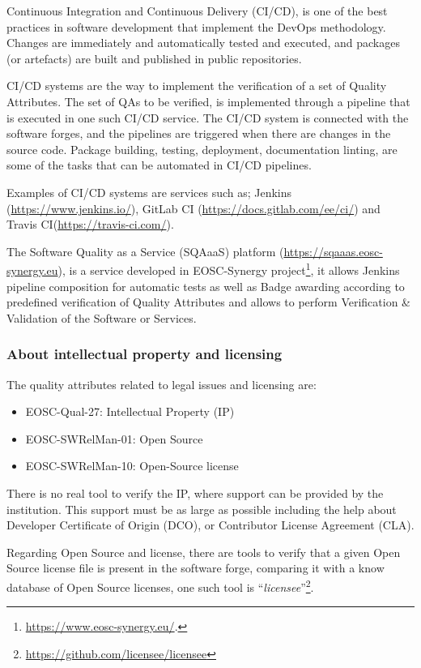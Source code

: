 Continuous Integration and Continuous Delivery (CI/CD), is one of the best practices in software development that implement the DevOps methodology. Changes are immediately and automatically tested and executed, and packages (or artefacts) are built and published in public repositories. 

CI/CD systems are the way to implement the verification of a set of Quality Attributes. The set of QAs to be verified, is implemented through a pipeline that is executed in one such CI/CD service. The CI/CD system is connected with the software forges, and the pipelines are triggered when there are changes in the source code.
Package building, testing, deployment, documentation linting, are some of the tasks that can be automated in CI/CD pipelines.

Examples of CI/CD systems are services such as; Jenkins (\url{https://www.jenkins.io/}), GitLab CI (\url{https://docs.gitlab.com/ee/ci/}) and Travis CI(\url{https://travis-ci.com/}).

The Software Quality as a Service (SQAaaS) platform (\url{https://sqaaas.eosc-synergy.eu}), is a service developed in EOSC-Synergy project\footnote{\url{https://www.eosc-synergy.eu/}.}, it allows Jenkins pipeline composition for automatic tests as well as Badge awarding according to predefined verification of Quality Attributes and allows to perform Verification \& Validation of the Software or Services.

\subsubsection{About intellectual property and licensing}

The quality attributes related to legal issues and licensing are:

\begin{itemize}
  \item EOSC-Qual-27: Intellectual Property (IP)
  \item EOSC-SWRelMan-01: Open Source
  \item EOSC-SWRelMan-10: Open-Source license
\end{itemize}

There is no real tool to verify the IP, where support can be provided by the institution. This support must be as large as possible including the help about Developer Certificate of Origin (DCO), or Contributor License Agreement (CLA).

Regarding Open Source and license, there are tools to verify that a given Open Source license file is present in the software forge, comparing it with a know database of Open Source licenses, one such tool is ``\textit{licensee}''\footnote{\url{https://github.com/licensee/licensee}}.

